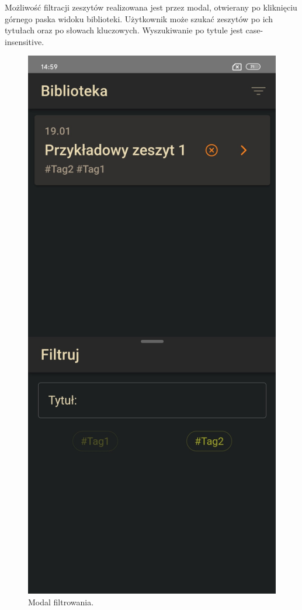 Możliwość filtracji zeszytów realizowana jest przez modal, otwierany po kliknięciu górnego paska widoku biblioteki.
Użytkownik może szukać zeszytów po ich tytułach oraz po słowach kluczowych. Wyszukiwanie po tytule jest case-insensitive.

\begin{figure}[H]
	\begin{center}
		\includegraphics[scale=0.2]{media/FilterModal.jpg}
	\end{center}
	\caption{Modal filtrowania.}
	\label{rys:filter-modal}
\end{figure}

